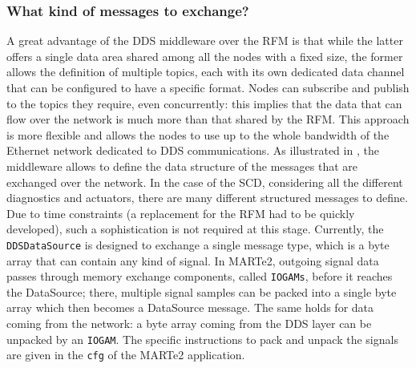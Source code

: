 \subsubsection{What kind of messages to exchange?}
\label{sec:ddsdatasource_messages}
A great advantage of the DDS middleware over the RFM is that while the latter offers a single data area shared among all the nodes with a fixed size, the former allows the definition of multiple topics, each with its own dedicated data channel that can be configured to have a specific format. Nodes can subscribe and publish to the topics they require, even concurrently: this implies that the data that can flow over the network is much more than that shared by the RFM. This approach is more flexible and allows the nodes to use up to the whole bandwidth of the Ethernet network dedicated to DDS communications. As illustrated in , the middleware allows to define the data structure of the messages that are exchanged over the network. In the case of the SCD, considering all the different diagnostics and actuators, there are many different structured messages to define. Due to time constraints (a replacement for the RFM had to be quickly developed), such a sophistication is not required at this stage. Currently, the \texttt{DDSDataSource} is designed to exchange a single message type, which is a byte array that can contain any kind of signal. In MARTe2, outgoing signal data passes through memory exchange components, called \texttt{IOGAMs}, before it reaches the DataSource; there, multiple signal samples can be packed into a single byte array which then becomes a DataSource message. The same holds for data coming from the network: a byte array coming from the DDS layer can be unpacked by an \texttt{IOGAM}. The specific instructions to pack and unpack the signals are given in the \texttt{cfg} of the MARTe2 application.

